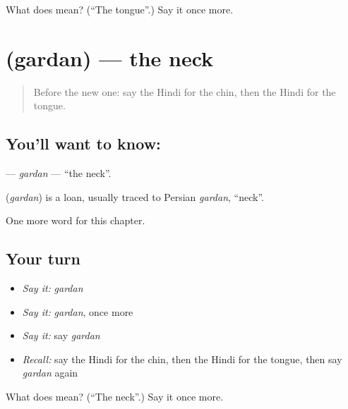 \begin{tcolorbox}[breakable,colback=teal!4,colframe=teal!35!black,title={Before you move on}]
What does  mean? (\textquotedblleft{}The tongue\textquotedblright{}.) Say it once more.
\end{tcolorbox}
\section[\texorpdfstring{\hi{गर्दन} (gardan)}{गर्दन (gardan)}]{ (gardan) — the neck}

\label{lesson:HI-C151-gardan}



\begin{quote}
Before the new one: say the Hindi for the chin, then the Hindi for the tongue.
\end{quote}

\subsection*{You'll want to know: }
\textbf{} — \emph{gardan} — \textquotedblleft{}the neck\textquotedblright{}.

\begin{cousinweb}
\textbf{} (\emph{gardan}) is a loan, usually traced to Persian \emph{gardan}, \textquotedblleft{}neck\textquotedblright{}.
\end{cousinweb}

\begin{grammarlens}[title={What you've built}]
One more word for this chapter.
\end{grammarlens}

\subsection*{Your turn}
\begin{itemize}
\raggedright
  \item \emph{Say it:} \emph{gardan}
  \item \emph{Say it:} \emph{gardan}, once more
  \item \emph{Say it:} say \emph{gardan}
  \item \emph{Recall:} say the Hindi for the chin, then the Hindi for the tongue, then say \emph{gardan} again
\end{itemize}

\begin{tcolorbox}[breakable,colback=teal!4,colframe=teal!35!black,title={Before you move on}]
What does  mean? (\textquotedblleft{}The neck\textquotedblright{}.) Say it once more.
\end{tcolorbox}
